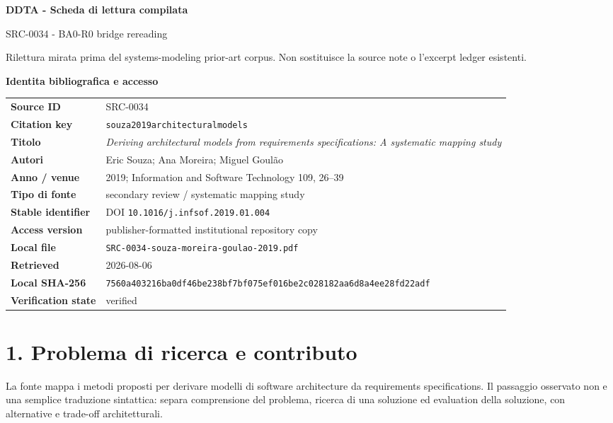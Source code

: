 \documentclass[10.5pt,a4paper]{article}
\newenvironment{factbox}[1]{\def\FrameCommand{\fcolorbox{ddtablue}{ddtagray}}\MakeFramed{\advance\hsize-2\width\FrameRestore}\noindent\textbf{#1}\par\smallskip}{\endMakeFramed}
\begin{document}
\begin{center}
{\LARGE\bfseries DDTA - Scheda di lettura compilata}\par
\vspace{0.2em}
{\large SRC-0034 - BA0-R0 bridge rereading}\par
\vspace{0.3em}
{\small Rilettura mirata prima del systems-modeling prior-art corpus. Non sostituisce la source note o l'excerpt ledger esistenti.}
\end{center}

\begin{factbox}{Identita bibliografica e accesso}
\begin{tabularx}{\linewidth}{>{\bfseries}p{3.4cm}X}
Source ID & SRC-0034\\
Citation key & \texttt{souza2019architecturalmodels}\\
Titolo & \textit{Deriving architectural models from requirements specifications: A systematic mapping study}\\
Autori & Eric Souza; Ana Moreira; Miguel Goul\~ao\\
Anno / venue & 2019; Information and Software Technology 109, 26--39\\
Tipo di fonte & secondary review / systematic mapping study\\
Stable identifier & DOI \texttt{10.1016/j.infsof.2019.01.004}\\
Access version & publisher-formatted institutional repository copy\\
Local file & \texttt{SRC-0034-souza-moreira-goulao-2019.pdf}\\
Retrieved & 2026-08-06\\
Local SHA-256 & \texttt{7560a403216ba0df46be238bf7bf075ef016be2c028182aa6d8a4ee28fd22adf}\\
Verification state & verified\\
\end{tabularx}
\end{factbox}

\section{1. Problema di ricerca e contributo}
La fonte mappa i metodi proposti per derivare modelli di software architecture da requirements specifications. Il passaggio osservato non e una semplice traduzione sintattica: separa comprensione del problema, ricerca di una soluzione ed evaluation della soluzione, con alternative e trade-off architetturali.
\end{document}
